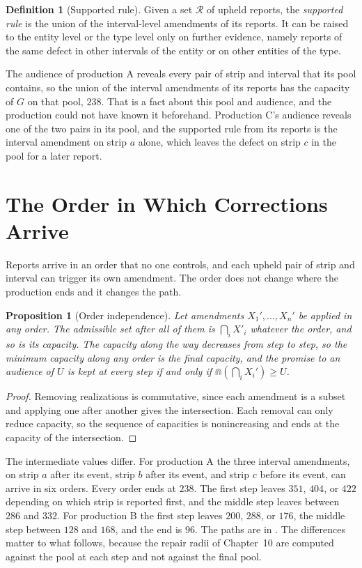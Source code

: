 \documentclass[11pt,twoside,openright]{book}
\theoremstyle{plain}
\newtheorem{proposition}[theorem]{Proposition}
\theoremstyle{definition}
\newtheorem{definition}[theorem]{Definition}
\theoremstyle{remark}
\begin{document}
\begin{definition}[Supported rule]\label{def:supported}
Given a set $\mathcal R$ of upheld reports, the \emph{supported rule} is the union of the interval-level amendments of its reports. It can be raised to the entity level or the type level only on further evidence, namely reports of the same defect in other intervals of the entity or on other entities of the type.
\end{definition}

The audience of production A reveals every pair of strip and interval that its pool contains, so the union of the interval amendments of its reports has the capacity of $G$ on that pool, $238$. That is a fact about this pool and audience, and the production could not have known it beforehand. Production C's audience reveals one of the two pairs in its pool, and the supported rule from its reports is the interval amendment on strip $a$ alone, which leaves the defect on strip $c$ in the pool for a later report.

\section{The Order in Which Corrections Arrive}\label{sec:order}

Reports arrive in an order that no one controls, and each upheld pair of strip and interval can trigger its own amendment. The order does not change where the production ends and it changes the path.

\begin{proposition}[Order independence]\label{prop:order}
Let amendments $X_1',\dots,X_n'$ be applied in any order. The admissible set after all of them is $\bigcap_iX'_i$ whatever the order, and so is its capacity. The capacity along the way decreases from step to step, so the minimum capacity along any order is the final capacity, and the promise to an audience of $U$ is kept at every step if and only if $\Cap(\bigcap_iX_i')\ge U$.
\end{proposition}

\begin{proof}
Removing realizations is commutative, since each amendment is a subset and applying one after another gives the intersection. Each removal can only reduce capacity, so the sequence of capacities is nonincreasing and ends at the capacity of the intersection.
\end{proof}

The intermediate values differ. For production A the three interval amendments, on strip $a$ after its event, strip $b$ after its event, and strip $c$ before its event, can arrive in six orders. Every order ends at $238$. The first step leaves $351$, $404$, or $422$ depending on which strip is reported first, and the middle step leaves between $286$ and $332$. For production B the first step leaves $200$, $288$, or $176$, the middle step between $128$ and $168$, and the end is $96$. The paths are in . The differences matter to what follows, because the repair radii of Chapter~10 are computed against the pool at each step and not against the final pool.
\end{document}

